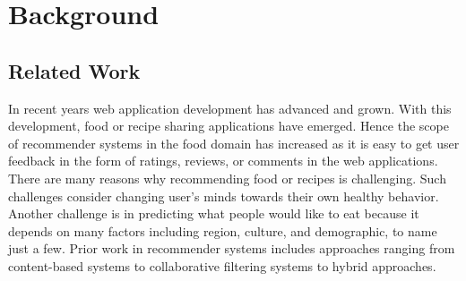 \chapter{Background}
\label{ch:background}
\section{Related Work}

In recent years web application development has advanced and grown. With this development, food or recipe sharing applications have emerged. Hence the scope of recommender systems in the food domain has increased as it is easy to get user feedback in the form of ratings, reviews, or comments in the web applications.
\\
\noindent There are many reasons why recommending food or recipes is challenging. Such challenges consider changing user's minds towards their own healthy behavior. Another challenge is in predicting what people would like to eat because it depends on many factors including region, culture, and demographic, to name just a few. Prior work in recommender systems includes approaches ranging from content-based systems to collaborative filtering systems to hybrid approaches.
\\

